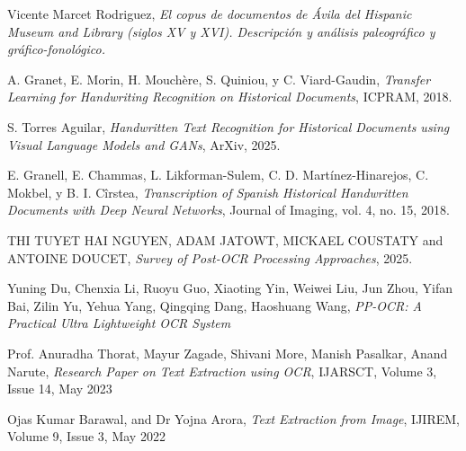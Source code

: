 \documentclass[11pt,a4paper]{article}
\begin{document}
\begin{thebibliography}{9}

    Vicente Marcet Rodriguez,
    \textit{El copus de documentos de \'Avila del Hispanic Museum and Library (siglos XV y XVI). Descripci\'on y an\'alisis paleogr\'afico y gr\'afico-fonol\'ogico.}

    A. Granet, E. Morin, H. Mouchère, S. Quiniou, y C. Viard-Gaudin, 
    \textit{Transfer Learning for Handwriting Recognition on Historical Documents}, 
    ICPRAM, 2018.
    
    S. Torres Aguilar, 
    \textit{Handwritten Text Recognition for Historical Documents using Visual Language Models and GANs}, 
    ArXiv, 2025.
    
    E. Granell, E. Chammas, L. Likforman-Sulem, C. D. Martínez-Hinarejos, C. Mokbel, y B. I. Cîrstea, 
    \textit{Transcription of Spanish Historical Handwritten Documents with Deep Neural Networks}, 
    Journal of Imaging, vol. 4, no. 15, 2018.
    
    THI TUYET HAI NGUYEN, ADAM JATOWT, MICKAEL COUSTATY and ANTOINE DOUCET,
    \textit{Survey of Post-OCR Processing Approaches}, 
    2025.

    Yuning Du, Chenxia Li, Ruoyu Guo, Xiaoting Yin, Weiwei Liu,
    Jun Zhou, Yifan Bai, Zilin Yu, Yehua Yang, Qingqing Dang, Haoshuang Wang,
    \textit{PP-OCR: A Practical Ultra Lightweight OCR System}
    
    Prof. Anuradha Thorat, Mayur Zagade, Shivani More, Manish Pasalkar, Anand Narute,
    \textit{Research Paper on Text Extraction using OCR}, 
    IJARSCT, Volume 3, Issue 14, May 2023

    Ojas Kumar Barawal, and Dr Yojna Arora,
    \textit{Text Extraction from Image}, 
    IJIREM, Volume 9, Issue 3, May 2022

\end{thebibliography}
\end{document}
